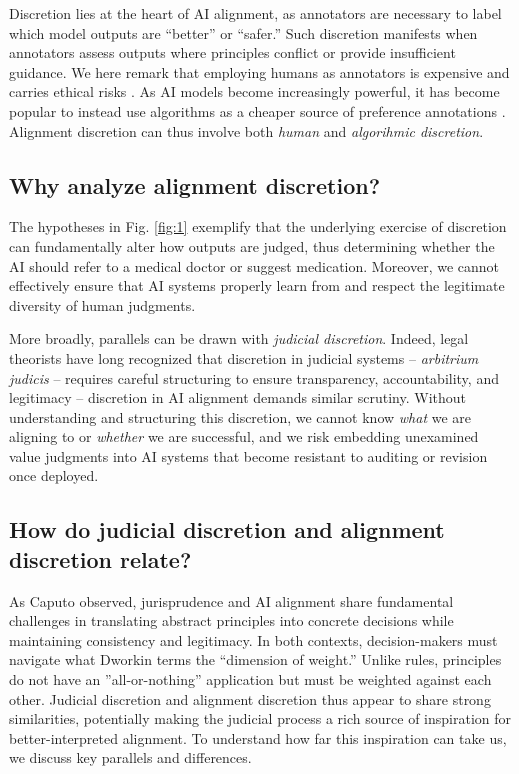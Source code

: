 \documentclass{article}
\begin{document}
Discretion lies at the heart of AI alignment, as annotators are necessary to label which model outputs are ``better'' or ``safer.'' Such discretion manifests when annotators assess outputs where principles conflict or provide insufficient guidance. We here remark that employing humans as annotators is expensive and carries ethical risks \cite{D_az_2022, hornuf2022hourly}. As AI models become increasingly powerful, it has become popular to instead use algorithms as a cheaper source of preference annotations \cite{bai2022constitutional, lee2023rlaif, cui2023ultrafeedback}. Alignment discretion can thus involve both \textit{human} and \textit{algorihmic discretion}. 

\subsection{Why analyze alignment discretion?}
The hypotheses in Fig. \ref{fig:1} exemplify that the underlying exercise of discretion can fundamentally alter how outputs are judged, thus determining whether the AI should refer to a medical doctor or suggest medication. Moreover, we cannot effectively ensure that AI systems properly learn from and respect the legitimate diversity of human judgments. 

More broadly, parallels can be drawn with \textit{judicial discretion}. 
Indeed, legal theorists have long recognized that discretion in judicial systems -- \emph{arbitrium judicis} -- requires careful structuring to ensure transparency, accountability, and legitimacy \cite{davis1969discretionary,lasser2009judicial} -- discretion in AI alignment demands similar scrutiny. Without understanding and structuring this discretion, we cannot know \textit{what} we are aligning to or \textit{whether} we are successful, and we risk embedding unexamined value judgments into AI systems that become resistant to auditing or revision once deployed. 



\subsection{How do judicial discretion and alignment discretion relate?}


As Caputo \cite{caputo2024alignment} observed, jurisprudence and AI alignment share fundamental challenges in translating abstract principles into concrete decisions while maintaining consistency and legitimacy. In both contexts, decision-makers must navigate what Dworkin \cite{dworkin2013taking} terms the ``dimension of weight.'' Unlike rules, principles do not have an ''all-or-nothing'' application but must be weighted against each other. 
Judicial discretion and alignment discretion thus appear to share strong similarities, potentially making the judicial process a rich source of inspiration for better-interpreted alignment. To understand how far this inspiration can take us, we discuss key parallels and differences.
\end{document}
